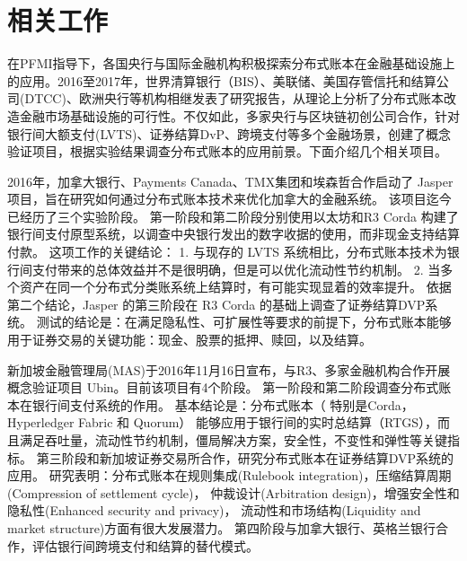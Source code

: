 \section{相关工作}\label{sec:related}

在PFMI指导下，各国央行与国际金融机构积极探索分布式账本在金融基础设施上的应用。2016至2017年，世界清算银行（BIS）\cite{bis_dlt}、美联储\cite{fr}、美国存管信托和结算公司(DTCC)\cite{dtcc2016}、欧洲央行\cite{euro}等机构相继发表了研究报告，从理论上分析了分布式账本改造金融市场基础设施的可行性。不仅如此，多家央行与区块链初创公司合作，针对银行间大额支付(LVTS)、证券结算DvP、跨境支付等多个金融场景，创建了概念验证项目，根据实验结果调查分布式账本的应用前景。下面介绍几个相关项目。

2016年，加拿大银行、Payments Canada、TMX集团和埃森哲合作启动了 Jasper 项目，旨在研究如何通过分布式账本技术来优化加拿大的金融系统。
该项目迄今已经历了三个实验阶段。
第一阶段和第二阶段\cite{jasper2}分别使用以太坊和R3 Corda 构建了银行间支付原型系统，以调查中央银行发出的数字收据的使用，而非现金支持结算付款。
这项工作的关键结论：
1. 与现存的 LVTS 系统相比，分布式账本技术为银行间支付带来的总体效益并不是很明确，但是可以优化流动性节约机制。
2. 当多个资产在同一个分布式分类账系统上结算时，有可能实现显着的效率提升。
依据第二个结论，Jasper 的第三阶段\cite{jasper3}在 R3 Corda 的基础上调查了证券结算DVP系统。
测试的结论是：在满足隐私性、可扩展性等要求的前提下，分布式账本能够用于证券交易的关键功能：现金、股票的抵押、赎回，以及结算。


新加坡金融管理局(MAS)于2016年11月16日宣布，与R3、多家金融机构合作开展概念验证项目 Ubin。目前该项目有4个阶段。
第一阶段\cite{mas1}和第二阶段\cite{mas2}调查分布式账本在银行间支付系统的作用。
基本结论是：分布式账本（ 特别是Corda，Hyperledger Fabric 和 Quorum） 能够应用于银行间的实时总结算（RTGS），而且满足吞吐量，流动性节约机制，僵局解决方案，安全性，不变性和弹性等关键指标。
第三阶段\cite{mas3}和新加坡证券交易所合作，研究分布式账本在证券结算DVP系统的应用。
研究表明：分布式账本在规则集成(Rulebook integration)，压缩结算周期(Compression of settlement cycle)，
仲裁设计(Arbitration design)，增强安全性和隐私性(Enhanced security and privacy)，
流动性和市场结构(Liquidity and market structure)方面有很大发展潜力。
第四阶段\cite{mas4}与加拿大银行、英格兰银行合作，评估银行间跨境支付和结算的替代模式。

